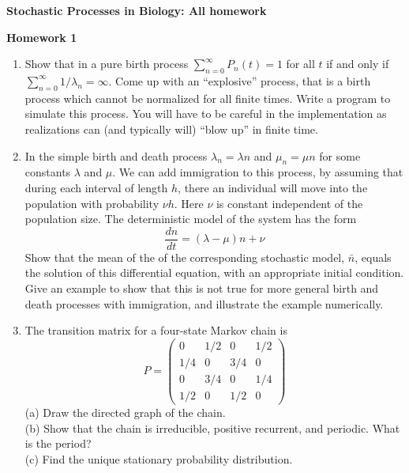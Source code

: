 \documentclass[12pt]{article}
\begin{document}
\begin{center}
{\Huge \bf Stochastic Processes in Biology: All homework
\\ \vskip5mm }
\end{center}

\begin{center}
{\Large \bf Homework 1
\\ \vskip5mm }
\end{center}

\vskip5mm 

\begin{enumerate}

\item Show that in a pure birth process $\sum_{n = 0}^{\infty} P_n(t) = 1$ for all $t$ if and only 
if $\sum_{n = 0}^{\infty} 1/\lambda_n = \infty$.  Come up with an ``explosive'' process, that is a 
birth process which cannot be normalized for all finite times.   Write a program to simulate this 
process.   You will have to be careful in the implementation
as realizations can (and typically will) ``blow up'' in finite time.


\item In the simple birth and death  process $\lambda_n = \lambda n$ and $\mu_n = \mu n$ for
some constants $\lambda$ and $\mu$.   We can add immigration to this process, by assuming that
during each interval of length $h$, there an individual will move into the population with probability
$\nu h$.  Here $\nu$ is constant independent of the population size.  The deterministic model of the system
has the form
$$ 
\frac{dn}{dt} = (\lambda - \mu)n + \nu
$$
Show that the mean of the of the corresponding stochastic model, $\bar n$, equals the solution 
of this differential equation, with an appropriate initial condition.    Give an example to show that
this is not true for more general birth and death processes with immigration, and illustrate the 
example numerically.

\item The transition matrix for a four-state Markov chain is
$$
P=\begin{pmatrix}
0 & 1/2 & 0 & 1/2\\
1/4 & 0 & 3/4 & 0\\
0 & 3/4 & 0 & 1/4\\
1/2 & 0 & 1/2 & 0
\end{pmatrix}
$$
(a) Draw the directed graph of the chain.\\
(b) Show that the chain is irreducible, positive recurrent, and periodic.
What is the period?\\
(c) Find the unique stationary probability distribution.


\end{enumerate}
\end{document}
